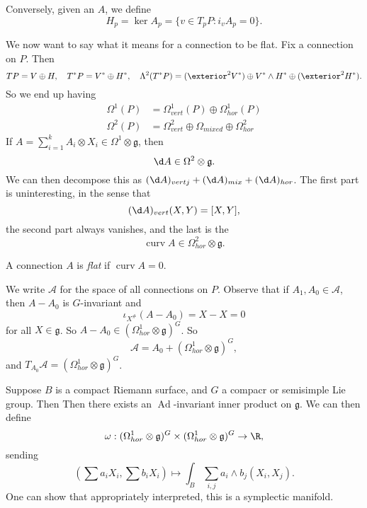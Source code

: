 \documentclass[a4paper]{article}
\DeclareMathOperator{\Ad}{Ad}
\DeclareMathOperator{\curv}{curv}
\begin{document}
\begin{eg}
  Conversely, given an $A$, we define
  \[
    H_p = \ker A_p = \{v \in T_p P : i_v A_p = 0\}.
  \]

  We now want to say what it means for a connection to be flat. Fix a connection on $P$. Then
  \[
    TP = V \oplus H,\quad T^*P = V^* \oplus H^*,\quad \Lambda^2 (T^*P) = (\exterior^2 V^*) \oplus V^* \wedge H^*  \oplus (\exterior^2 H^*).
  \]
  So we end up having
  \begin{align*}
    \Omega^1(P) &= \Omega^1_{vert}(P) \oplus \Omega^1_{hor}(P)\\
    \Omega^2(P) &= \Omega_{vert}^2 \oplus \Omega_{mixed} \oplus \Omega^2_{hor}
  \end{align*}
  If $A = \sum_{i = 1}^k A_i \otimes X_i \in \Omega^1 \otimes \mathfrak{g}$, then
  \[
    \d A \in \Omega^2 \otimes \mathfrak{g}.
  \]
  We can then decompose this as $(\d A)_{vertj}+ (\d A)_{mix} + (\d A)_{hor}$. The first part is uninteresting, in the sense that
  \[
    (\d A)_{vert}(X, Y) = [X, Y],
  \]
  the second part always vanishes, and the last is the 
  \[
    \curv A \in \Omega_{hor}^2 \otimes \mathfrak{g}.
  \]
  \begin{defi}
    A connection $A$ is \emph{flat} if $\curv A = 0$.
  \end{defi}
  We write $\mathcal{A}$ for the space of all connections on $P$. Observe that if $A_1, A_0 \in \mathcal{A}$, then $A - A_0$ is $G$-invariant and
  \[
    \iota_{X^\#}(A - A_0) = X - X = 0
  \]
  for all $X \in \mathfrak{g}$. So $A - A_0  \in (\Omega^1_{hor} \otimes \mathfrak{g})^G$. So
  \[
    \mathcal{A} = A_0 + (\Omega^1_{hor} \otimes \mathfrak{g})^G,
  \]
  and $T_{A_0} \mathcal{A} = (\Omega^1_{hor} \otimes \mathfrak{g})^G$.

  Suppose $B$ is a compact Riemann surface, and $G$ a compacr or semisimple Lie group. Then  Then there exists an $\Ad$-invariant inner product on $\mathfrak{g}$. We can then define
  \[
    \omega: (\Omega^1_{hor} \otimes \mathfrak{g})^G \times (\Omega_{hor}^1 \otimes \mathfrak{g})^G \to \R,
  \]
  sending
  \[
    \left(\sum a_i X_i, \sum b_i X_i\right) \mapsto \int_B \sum_{i, j} a_i \wedge b_j (X_i, X_j).
  \]
  One can show that appropriately interpreted, this is a symplectic manifold.
\end{eg}
\end{document}
